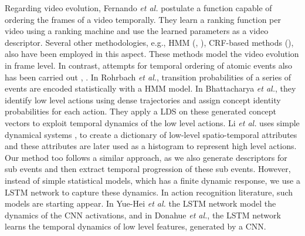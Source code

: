 Regarding video evolution, Fernando \textit{et al.}\cite{fernando2015modeling} postulate
a function capable of ordering the frames of a video
temporally. They learn a ranking function per video using a ranking machine and use the learned parameters as 
a video descriptor. Several other methodologies, e.g., HMM (\cite{wang2011hidden}, \cite{wu2014leveraging}), 
CRF-based methods (\cite{song2013action}), also have been employed in this aspect. These methods model the video evolution in frame 
level. In contrast, attempts for temporal ordering of atomic events also has been carried out \cite{rohrbach2012script}, \cite{bhattacharya2014recognition}.
In Rohrbach \textit{et al.}\cite{rohrbach2012script}, transition probabilities of a series of events are encoded statistically with a HMM model. 
In Bhattacharya \textit{et al.}\cite{bhattacharya2014recognition}, they identify low level actions using dense trajectories and assign concept identity 
probabilities for each action. They apply a LDS on these generated concept vectors to exploit temporal 
dynamics of the low level actions. Li \textit{et al.}\cite{li2013recognizing} uses simple dynamical systems \cite{jackson1992perspectives},
\cite{kailath1974view} to create a dictionary of low-level spatio-temporal attributes and these attributes 
are later used as a histogram to represent high level actions. Our method too follows a similar approach,
as we also generate descriptors for sub events and then extract temporal progression 
of these sub events. However, instead of simple statistical models, which has a finite dynamic response, 
we use a LSTM network \cite{hochreiter1997long} to capture these dynamics. In action recognition literature,
such models are starting appear. In Yue-Hei \textit{et al.}
\cite{yue2015beyond} the LSTM network model the dynamics of the CNN activations, and in Donahue \textit{et al.}\cite{donahue2015long},
the LSTM network learns the temporal dynamics of low level features, generated by a CNN. 

